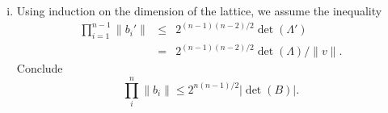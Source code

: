 \documentclass[11pt,a4paper]{article}
\begin{document}
\begin{enumerate}[1)]
\begin{enumerate}[i)]
 \item Using induction on the dimension of the lattice, we assume the inequality
   \begin{eqnarray*}
     ∏_{i=1}^{n-1}  \| b_i'\| & ≤ &   2^{(n-1) (n-2)/2}  \det (Λ') \\
                            & =  & 2^{(n-1) (n-2)/2}  \det (Λ) /\|v\|. 
   \end{eqnarray*}
   Conclude
   \begin{displaymath}
     ∏_i^n \|b_i\| ≤ 2^{n (n-1)/2}  |\det (B)|.
   \end{displaymath}



 \end{enumerate}

 

 

  
\end{enumerate}



%
%


 
\end{document}
